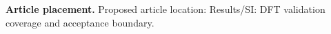 \textbf{Article placement.} Proposed article location: Results/SI: DFT validation coverage and acceptance boundary.

